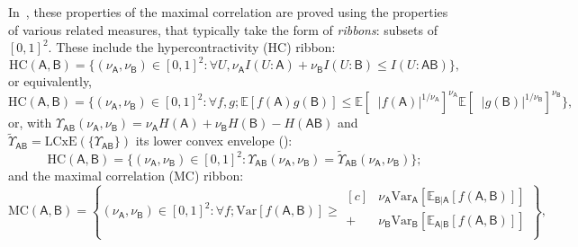 \documentclass[10pt, a4paper]{article}
\numberwithin{equation}{section} %
\theoremstyle{definition}
\theoremstyle{plain}
\newcommand{\abs}[1]{\mathop{}\left\lvert#1\right\rvert}
\newcommand{\st}{\mathrel{:}} %
\newcommand{\?}{\mathrel{?}} %
\newcommand{\E}{\mathbb{E}} %
\newcommand{\Var}{\mathrm{Var}} %
\newcommand{\crv}[1]{\mathsf{#1}}
\newcommand{\LCxE}[1]{\mathrm{LCxE}\left(#1\right)}
\newcommand{\HC}{\mathrm{HC}}
\newcommand{\MC}{\mathrm{MC}}
\begin{document}
                        In~\cite{NLMonotones}, these properties of the maximal correlation are proved using the properties of various related measures, that typically take the form of \emph{ribbons}: subsets of \({[0,1]}^2\). These include the hypercontractivity (HC) ribbon:
                        \begin{equation}
                          \HC(\crv{A},\crv{B}) = \{(\nu_{\crv{A}}, \nu_{\crv{B}}) \in {[0,1]}^2 \st \forall U, \nu_{\crv{A}} I(U:\crv{A}) + \nu_{\crv{B}} I(U:\crv{B}) \leq I(U:\crv{AB})\},
                        \end{equation}
                        or equivalently,
                        \begin{equation}
                          \HC(\crv{A},\crv{B}) = \{(\nu_{\crv{A}}, \nu_{\crv{B}}) \in {[0,1]}^2 \st \forall f,g; \E[f(\crv{A})g(\crv{B})] \leq {\E[\abs{f(\crv{A})}^{1/\nu_{\crv{A}}}]}^{\nu_{\crv{A}}} {\E[\abs{g(\crv{B})}^{1/\nu_{\crv{B}}}]}^{\nu_{\crv{B}}} \},
                        \end{equation}
                        or, with \(\Upsilon_{\crv{AB}}(\nu_{\crv{A}}, \nu_{\crv{B}}) = \nu_{\crv{A}} H(\crv{A}) + \nu_{\crv{B}} H(\crv{B}) - H(\crv{AB})\) and \(\tilde{\Upsilon}_{\crv{AB}} = \LCxE{\{\Upsilon_{\crv{AB}}\}}\) its lower convex envelope ():
                        \begin{equation}
                          \HC(\crv{A},\crv{B}) = \{(\nu_{\crv{A}}, \nu_{\crv{B}}) \in {[0,1]}^2 \st \Upsilon_{\crv{AB}}(\nu_{\crv{A}}, \nu_{\crv{B}}) = \tilde{\Upsilon}_{\crv{AB}}(\nu_{\crv{A}}, \nu_{\crv{B}}) \};
                        \end{equation}
                        and the maximal correlation (MC) ribbon:
                        \begin{equation}
                          \MC(\crv{A},\crv{B}) = \left\{ 
                            (\nu_{\crv{A}}, \nu_{\crv{B}}) \in {[0,1]}^2 \st \forall f; \Var[f(\crv{A},\crv{B})] \geq 
                            \begin{aligned}[c]
          & \nu_{\crv{A}} \Var_{\crv{A}}[\E_{\crv{B}|\crv{A}}[f(\crv{A},\crv{B})]] \\
                              + & \nu_{\crv{B}} \Var_{\crv{B}}[\E_{\crv{A}|\crv{B}}[f(\crv{A},\crv{B})]] \\
                            \end{aligned}
                          \right\},
                        \end{equation}
\end{document}
